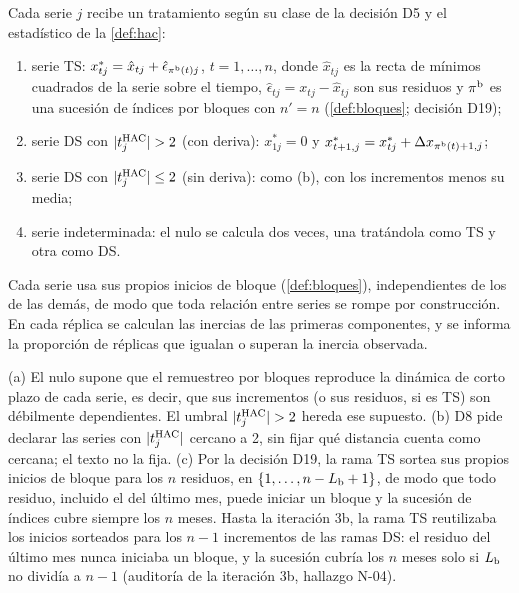 \begin{definicion}\label{def:nulo-mixto}
Cada serie $j$ recibe un tratamiento según su clase de la decisión D5 y el estadístico de la
\cref{def:hac}:
\begin{enumerate}[label=(\alph*)]
  \item serie TS: $x^\ast_{tj}=\hat x_{tj}+\hat\epsilon_{\pi^{\mathrm{b}}(t)j}$, $t=1,\dots,n$, donde $\hat x_{tj}$
    es la recta de mínimos cuadrados de la serie sobre el tiempo, $\hat\epsilon_{tj}=x_{tj}-\hat
    x_{tj}$ son sus residuos y $\pi^{\mathrm{b}}$ es una sucesión de índices por bloques con $n'=n$
    (\cref{def:bloques}; decisión D19);
  \item serie DS con $\lvert t^{\mathrm{HAC}}_j\rvert>2$ (con deriva): $x^\ast_{1j}=0$ y
    $x^\ast_{t+1,j}=x^\ast_{tj}+\Delta x_{\pi^{\mathrm{b}}(t)+1,j}$;
  \item serie DS con $\lvert t^{\mathrm{HAC}}_j\rvert\le2$ (sin deriva): como (b), con los incrementos menos
    su media;
  \item serie indeterminada: el nulo se calcula dos veces, una tratándola como TS y otra como DS.
\end{enumerate}
Cada serie usa sus propios inicios de bloque (\cref{def:bloques}), independientes de los de las
demás, de modo que toda relación entre series se rompe por construcción. En cada réplica se
calculan las inercias de las primeras componentes, y se informa la proporción de réplicas que
igualan o superan la inercia observada.
\end{definicion}

\begin{observacion}\label{obs:nulo-mixto}
(a) El nulo supone que el remuestreo por bloques reproduce la dinámica de corto plazo de cada
serie, es decir, que sus incrementos (o sus residuos, si es TS) son débilmente dependientes. El
umbral $\lvert t^{\mathrm{HAC}}_j\rvert>2$ hereda ese supuesto. (b) D8 pide declarar las series con
$\lvert t^{\mathrm{HAC}}_j\rvert$ cercano a 2, sin fijar qué distancia cuenta como cercana; el texto no la
fija. (c) Por la decisión D19, la rama TS sortea sus propios inicios de bloque para los $n$
residuos, en $\{1,\dots,n-L_{\mathrm{b}}+1\}$, de modo que todo residuo, incluido el del último mes, puede
iniciar un bloque y la sucesión de índices cubre siempre los $n$ meses. Hasta la iteración 3b,
la rama TS reutilizaba los inicios sorteados para los $n-1$ incrementos de las ramas DS: el
residuo del último mes nunca iniciaba un bloque, y la sucesión cubría los $n$ meses solo si
$L_{\mathrm{b}}$ no dividía a $n-1$ (auditoría de la iteración 3b, hallazgo N-04).
\end{observacion}

